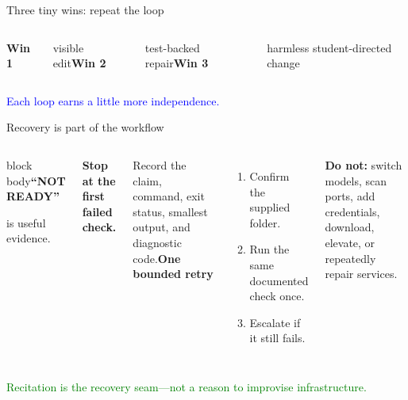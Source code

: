 \documentclass[aspectratio=169,11pt]{beamer}
\begin{document}
\begin{frame}{Three tiny wins: repeat the loop}\centering{}\vspace{.7cm}\begin{columns}[T]\textbf{Win 1}\par visible edit\textbf{Win 2}\par test-backed repair\textbf{Win 3}\par harmless student-directed change\end{columns}\vfill\textcolor{blue}{Each loop earns a little more independence.}\end{frame}
\begin{frame}{Recovery is part of the workflow}\begin{columns}[T]\begin{beamercolorbox}[sep=.8em,wd=\linewidth]{block body}\centering\Huge\textbf{“NOT READY”}\par\vspace{.3cm}\normalsize is useful evidence.\end{beamercolorbox}\vspace{.45cm}\textbf{Stop at the first failed check.}\par Record the claim, command, exit status, smallest output, and diagnostic code.\textbf{One bounded retry}\begin{enumerate}\item Confirm the supplied folder.\item Run the same documented check once.\item Escalate if it still fails.\end{enumerate}\textbf{Do not:} switch models, scan ports, add credentials, download, elevate, or repeatedly repair services.\end{columns}\vfill\textcolor{green}{Recitation is the recovery seam—not a reason to improvise infrastructure.}\end{frame}
\end{document}
